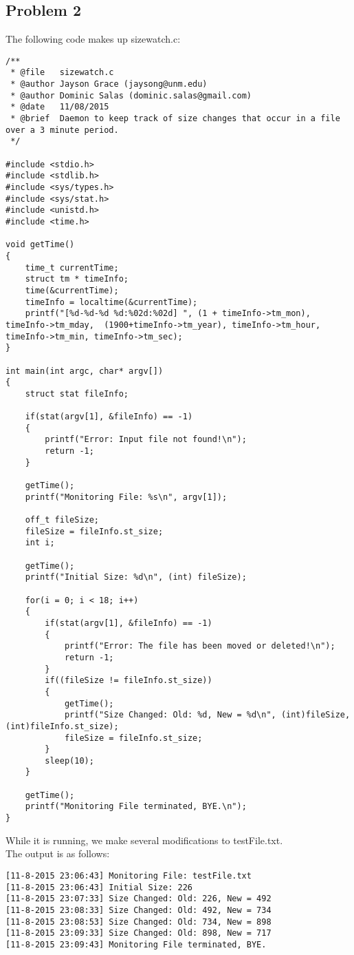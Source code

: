 \documentclass[12pt, a4paper, oneside]{article}
\begin{document}
\subsection*{Problem 2}
The following code makes up sizewatch.c: \\
\begin{lstlisting}
/**
 * @file   sizewatch.c
 * @author Jayson Grace (jaysong@unm.edu)
 * @author Dominic Salas (dominic.salas@gmail.com)
 * @date   11/08/2015
 * @brief  Daemon to keep track of size changes that occur in a file over a 3 minute period.
 */

#include <stdio.h>
#include <stdlib.h>
#include <sys/types.h>
#include <sys/stat.h>
#include <unistd.h>
#include <time.h>

void getTime()
{
    time_t currentTime;
    struct tm * timeInfo;
    time(&currentTime);
    timeInfo = localtime(&currentTime);
    printf("[%d-%d-%d %d:%02d:%02d] ", (1 + timeInfo->tm_mon), timeInfo->tm_mday,  (1900+timeInfo->tm_year), timeInfo->tm_hour, timeInfo->tm_min, timeInfo->tm_sec);
}

int main(int argc, char* argv[])
{
    struct stat fileInfo;

    if(stat(argv[1], &fileInfo) == -1)
    {
        printf("Error: Input file not found!\n");
        return -1;
    }

    getTime();
    printf("Monitoring File: %s\n", argv[1]);

    off_t fileSize;
    fileSize = fileInfo.st_size;
    int i;

    getTime();
    printf("Initial Size: %d\n", (int) fileSize);

    for(i = 0; i < 18; i++)
    {
        if(stat(argv[1], &fileInfo) == -1)
        {
            printf("Error: The file has been moved or deleted!\n");
            return -1;
        }
        if((fileSize != fileInfo.st_size))
        {
            getTime();
            printf("Size Changed: Old: %d, New = %d\n", (int)fileSize, (int)fileInfo.st_size);
            fileSize = fileInfo.st_size;
        }
        sleep(10);
    }

    getTime();
    printf("Monitoring File terminated, BYE.\n");
}
\end{lstlisting}

\pagebreak

While it is running, we make several modifications to testFile.txt. \\
The output is as follows: \\
\begin{lstlisting}
[11-8-2015 23:06:43] Monitoring File: testFile.txt
[11-8-2015 23:06:43] Initial Size: 226
[11-8-2015 23:07:33] Size Changed: Old: 226, New = 492
[11-8-2015 23:08:33] Size Changed: Old: 492, New = 734
[11-8-2015 23:08:53] Size Changed: Old: 734, New = 898
[11-8-2015 23:09:33] Size Changed: Old: 898, New = 717
[11-8-2015 23:09:43] Monitoring File terminated, BYE.
\end{lstlisting}
\end{document}
